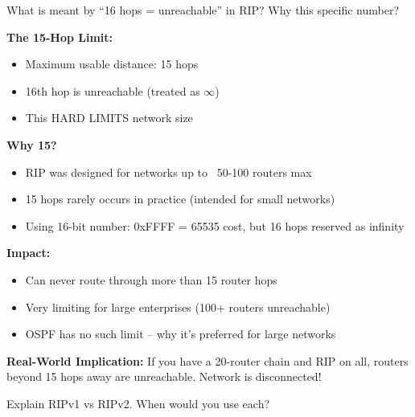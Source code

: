\documentclass[12pt,a4paper]{article}
\begin{document}

\begin{qbox}{What is meant by ``16 hops = unreachable'' in RIP? Why this specific number?}
\end{qbox}

\begin{abox}
\textbf{The 15-Hop Limit:}
\begin{itemize}
    \item Maximum usable distance: 15 hops
    \item 16th hop is unreachable (treated as $\infty$)
    \item This HARD LIMITS network size
\end{itemize}

\textbf{Why 15?}
\begin{itemize}
    \item RIP was designed for networks up to ~50-100 routers max
    \item 15 hops rarely occurs in practice (intended for small networks)
    \item Using 16-bit number: 0xFFFF = 65535 cost, but 16 hops reserved as infinity
\end{itemize}

\textbf{Impact:}
\begin{itemize}
    \item Can never route through more than 15 router hops
    \item Very limiting for large enterprises (100+ routers unreachable)
    \item OSPF has no such limit -- why it's preferred for large networks
\end{itemize}

\textbf{Real-World Implication:} If you have a 20-router chain and RIP on all, routers beyond 15 hops away are unreachable. Network is disconnected!
\end{abox}


\begin{qbox}{Explain RIPv1 vs RIPv2. When would you use each?}
\end{qbox}
\end{document}
